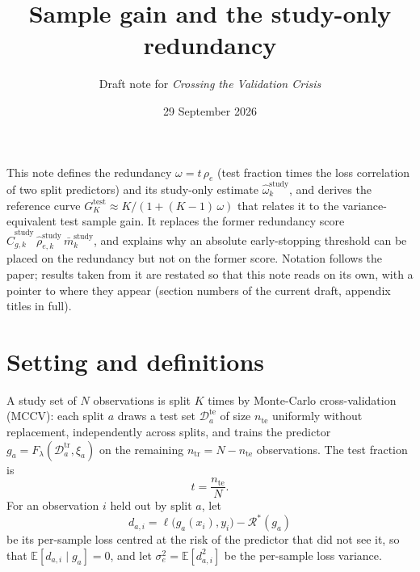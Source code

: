 \documentclass[11pt]{article}
\title{Sample gain and the study-only redundancy}
\author{Draft note for \emph{Crossing the Validation Crisis}}
\date{29 September 2026}
\begin{document}
\maketitle

\noindent
This note defines the redundancy $\omega = t\,\rho_e$ (test fraction times the loss correlation
of two split predictors) and its study-only estimate $\widehat\omega^{\mathrm{study}}_k$, and
derives the reference curve $G^{\text{test}}_K \approx K/(1+(K-1)\,\omega)$ that relates it to the
variance-equivalent test sample gain. It replaces the former redundancy score
$\widehat C^{\mathrm{study}}_{g,k}\,\widehat\rho^{\mathrm{study}}_{e,k}\,\bar m^{\mathrm{study}}_k$,
and explains why an absolute early-stopping threshold can be placed on the redundancy but not on
the former score. Notation follows the
paper; results taken from it are restated so that this note reads on its own, with a pointer
to where they appear (section numbers of the current draft, appendix titles in full).

\section{Setting and definitions}

A study set of $N$ observations is split $K$ times by Monte-Carlo cross-validation (MCCV):
each split $a$ draws a test set $\mathcal{D}^{\text{te}}_a$ of size $n_{\text{te}}$ uniformly
without replacement, independently across splits, and trains the predictor
$g_a = F_\lambda(\mathcal{D}^{\text{tr}}_a,\xi_a)$ on the remaining
$n_{\text{tr}} = N - n_{\text{te}}$ observations. The test fraction is
\begin{equation}
  t = \frac{n_{\text{te}}}{N}.
\end{equation}
For an observation $i$ held out by split $a$, let
\begin{equation}
  d_{a,i} = \ell\bigl(g_a(x_i), y_i\bigr) - \mathcal{R}^*(g_a)
\end{equation}
be its per-sample loss centred at the risk of the predictor that did not see it, so that
$\mathbb{E}[d_{a,i} \mid g_a] = 0$, and let $\sigma^2_e = \mathbb{E}[d_{a,i}^2]$ be the
per-sample loss variance.
\end{document}
